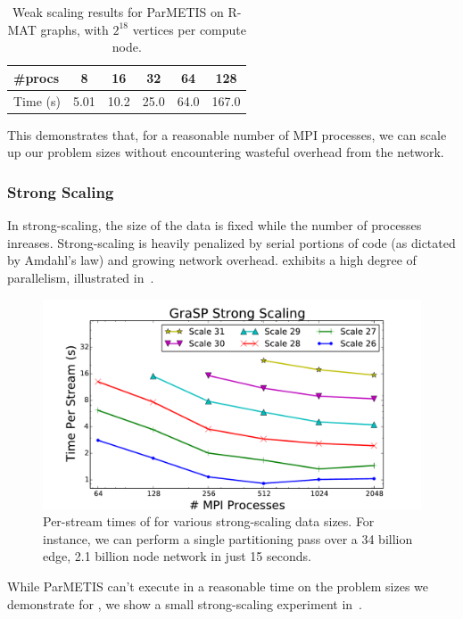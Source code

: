 \begin{table}
\caption{Weak scaling results for ParMETIS on R-MAT graphs, with $2^{18}$ vertices per compute node.}
\centering
\small
{ \begin{tabular}{ l | c | c | c | c | c }    \toprule
\#procs & 8 & 16 & 32 & 64 & 128 \\ \midrule
Time (s) & 5.01 & 10.2 & 25.0 & 64.0 & 167.0 \\
\hline
\end{tabular}\par
}
\label{tab:rmatpmweak}
\end{table}

This demonstrates that, for a reasonable number of MPI processes, we can scale up our problem sizes without encountering wasteful overhead from the network.

\subsubsection{Strong Scaling}
In strong-scaling, the size of the data is fixed while the number of processes inreases. 
Strong-scaling is heavily penalized by serial portions of code (as dictated by Amdahl's law) and growing network overhead. \ourmethod exhibits a high degree of parallelism, illustrated in~. 

\begin{figure}[b!]
\centering
  \includegraphics[width=0.9\columnwidth]{figures/strong_scaling.pdf}
  \caption{Per-stream times of \ourmethod for various strong-scaling data sizes. For instance, we can perform a single partitioning pass over a 34 billion edge, 2.1 billion node network in just 15 seconds.}
  \label{fig:kronspeed_strong}
\end{figure}

While ParMETIS can't execute in a reasonable time on the problem sizes we demonstrate for \ourmethod, we show a small strong-scaling experiment in~. 

